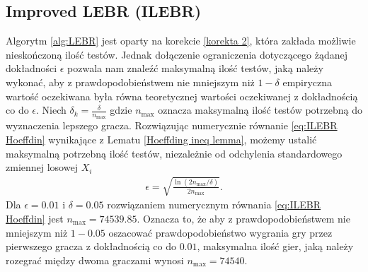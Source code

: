 \documentclass[inzynierska]{pwr_wmat_praca_dyplomowa}
\theoremstyle{plain}
\numberwithin{theorem}{chapter}
\theoremstyle{definition}
\numberwithin{theorem}{chapter}
\newcommand{\nmax}{n_{\text{max}}}
\begin{document}
	\subsection{Improved LEBR (ILEBR)}
	Algorytm \ref{alg:LEBR} jest oparty na korekcie \ref{korekta 2}, która zakłada możliwie nieskończoną ilość testów. Jednak dołączenie ograniczenia dotyczącego żądanej dokładności $\epsilon$ pozwala nam znaleźć maksymalną ilość testów, jaką należy wykonać, aby z prawdopodobieństwem nie mniejszym niż $1-\delta$ empiryczna wartość oczekiwana była równa teoretycznej wartości oczekiwanej z dokładnością co do $\epsilon$. Niech $\delta_k = \frac{\delta}{\nmax}$ gdzie $\nmax$ oznacza maksymalną ilość testów potrzebną do wyznaczenia lepszego gracza. Rozwiązując numerycznie równanie \eqref{eq:ILEBR Hoeffdin} wynikające z Lematu \ref{Hoeffding ineq lemma}, możemy ustalić maksymalną potrzebną ilość testów, niezależnie od odchylenia standardowego zmiennej losowej $X_i$
	\begin{gather}
		\label{eq:ILEBR Hoeffdin}
		\epsilon =  \sqrt{\frac{\ln(2\nmax/\delta)}{2\nmax}}.
	\end{gather}
	Dla $\epsilon=0.01$ i $\delta=0.05$ rozwiązaniem numerycznym równania \eqref{eq:ILEBR Hoeffdin} jest $\nmax=74539.85$. Oznacza to, że aby z prawdopodobieństwem nie mniejszym niż $1-0.05$ oszacować prawdopodobieństwo wygrania gry przez pierwszego gracza z dokładnością co do $0.01$, maksymalna ilość gier, jaką należy rozegrać między dwoma graczami wynosi $\nmax  = 74540$.
	   
\end{document}
